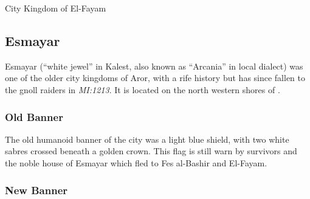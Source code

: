 \cleardoubleevenemptypage


\begin{infobox}{City Kingdom of El-Fayam}
  \begin{multicols}{2}
    \begin{itemize}[label={},noitemsep,leftmargin=0.0cm,topsep=0pt]
    \end{itemize}
  \end{multicols}
\end{infobox}

\clearpage

\subsection{Esmayar}
\label{sec:Esmayar}

Esmayar (``white jewel'' in Kalest, also known as ``Arcania'' in local
dialect) was one of the older city kingdoms of Aror, with a rife history but
has since fallen to the gnoll raiders in \emph{MI:1213}. It is located on the
north western shores of .

\subsubsection{Old Banner}

The old humanoid banner of the city was a light blue shield, with two white
sabres crossed beneath a golden crown. This flag is still warn by survivors and
the noble house of Esmayar which fled to Fes al-Bashir and El-Fayam.

\subsubsection{New Banner}

